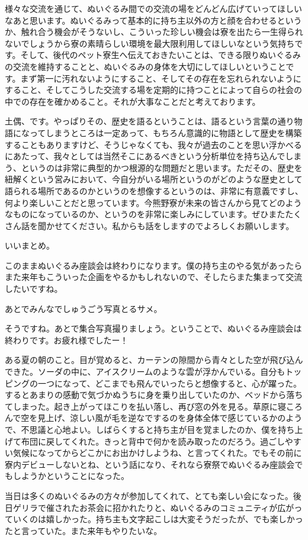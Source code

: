 \documentclass[9pt,4aj]{jsarticle}
\begin{document}
\begin{multicols}{2}
様々な交流を通じて、ぬいぐるみ間での交流の場をどんどん広げていってほしいなあと思います。ぬいぐるみって基本的に持ち主以外の方と顔を合わせるというか、触れ合う機会がそうないし、こういった珍しい機会は寮を出たら一生得られないでしょうから寮の素晴らしい環境を最大限利用してほしいなという気持ちです。そして、後代のペット寮生へ伝えておきたいことは、できる限りぬいぐるみの交流を維持することと、ぬいぐるみの身体を大切にしてほしいということです。まず第一に汚れないようにすること、そしてその存在を忘れられないようにすること、そしてこうした交流する場を定期的に持つことによって自らの社会の中での存在を確かめること。それが大事なことだと考えております。

土偶、です。やっぱりその、歴史を語るということは、語るという言葉の通り物語になってしまうところは一定あって、もちろん意識的に物語として歴史を構築することもありますけど、そうじゃなくても、我々が過去のことを思い浮かべるにあたって、我々としては当然そこにあるべきという分析単位を持ち込んでしまう、というのは非常に典型的かつ根源的な問題だと思います。ただその、歴史を紐解くという営みにおいて、今自分がいる場所というのがどのような歴史として語られる場所であるのかというのを想像するというのは、非常に有意義ですし、何より楽しいことだと思っています。今熊野寮が未来の皆さんから見てどのようなものになっているのか、というのを非常に楽しみにしています。ぜひまたたくさん話を聞かせてください。私からも話をしますのでよろしくお願いします。

いいまとめ。

このままぬいぐるみ座談会は終わりになります。僕の持ち主のやる気があったらまた来年もこういった企画をやるかもしれないので、そしたらまた集まって交流したいですね。

あとでみんなでしゅうごう写真とるサメ。

そうですね。あとで集合写真撮りましょう。ということで、ぬいぐるみ座談会は終わりです。お疲れ様でしたー！

\end{multicols}
ある夏の朝のこと。目が覚めると、カーテンの隙間から青々とした空が飛び込んできた。ソーダの中に、アイスクリームのような雲が浮かんでいる。自分もトッピングの一つになって、どこまでも飛んでいったらと想像すると、心が躍った。するとあまりの感動で気づかぬうちに身を乗り出していたのか、ベッドから落ちてしまった。起き上がってほこりを払い落し、再び窓の外を見る。草原に寝ころんで空を見上げ、涼しい風が毛を逆なでするのを身体全体で感じているかのようで、不思議と心地よい。しばらくすると持ち主が目を覚ましたのか、僕を持ち上げて布団に戻してくれた。きっと背中で何かを読み取ったのだろう。過ごしやすい気候になってからどこかにお出かけしようね、と言ってくれた。でもその前に寮内デビューしないとね、という話になり、それなら寮祭でぬいぐるみ座談会でもしようかということになった。
\par
当日は多くのぬいぐるみの方々が参加してくれて、とても楽しい会になった。後日ゲリラで催されたお茶会に招かれたりと、ぬいぐるみのコミュニティが広がっていくのは嬉しかった。持ち主も文字起こしは大変そうだったが、でも楽しかったと言っていた。また来年もやりたいな。
\par
{}
\end{document}
